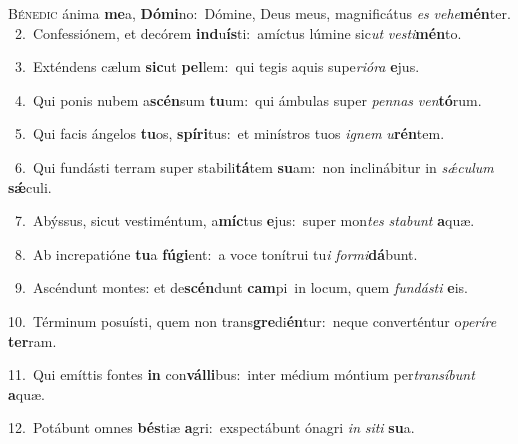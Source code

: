 \lettrine{\initial\textcolor{\initialcolor}{B}}{énedic} ánima \textbf{me}\-a, \textbf{Dó}\-\textbf{mi}no:~\star Dómine, Deus meus, magnificátus \textit{es} \textit{ve}\-\textit{he}\textbf{mén}ter.\\
{\numbfont\textcolor{\numbcolor}{~2.}}~Confessiónem, et decórem \textbf{ind}\-u\-\textbf{ís}\-ti:~\star amíctus lúmine sic\textit{ut} \textit{ves}\-\textit{ti}\textbf{mén}to.\par
{\numbfont\textcolor{\numbcolor}{~3.}}~Exténdens cælum \textbf{sic}\-ut \textbf{pel}\-lem:~\star qui tegis aquis supe\-\textit{ri}\-\textit{ó}\textit{ra} \textbf{e}\-jus.\par
{\numbfont\textcolor{\numbcolor}{~4.}}~Qui ponis nubem a\-\textbf{scén}\-sum \textbf{tu}\-um:~\star qui ámbulas super \textit{pen}\-\textit{nas} \textit{ven}\-\textbf{tó}rum.\par
{\numbfont\textcolor{\numbcolor}{~5.}}~Qui facis ángelos \textbf{tu}\-os, \textbf{spí}\-\textbf{ri}tus:~\star et minístros tuos \textit{i}\-\textit{gnem} \textit{u}\-\textbf{rén}tem.\par
{\numbfont\textcolor{\numbcolor}{~6.}}~Qui fundásti terram super stabili\-\textbf{tá}\-tem \textbf{su}\-am:~\star non inclinábitur in \textit{sǽ}\-\textit{cu}\textit{lum} \textbf{sǽ}\-culi.\par
{\numbfont\textcolor{\numbcolor}{~7.}}~Abýssus, sicut vestiméntum, a\-\textbf{míc}\-tus \textbf{e}\-jus:~\star super mon\textit{tes} \textit{sta}\-\textit{bunt} \textbf{a}\-quæ.\par
{\numbfont\textcolor{\numbcolor}{~8.}}~Ab increpatióne \textbf{tu}\-a \textbf{fú}\-\textbf{gi}ent:~\star a voce tonítrui tu\textit{i} \textit{for}\-\textit{mi}\textbf{dá}bunt.\par
{\numbfont\textcolor{\numbcolor}{~9.}}~Ascéndunt montes: et de\-\textbf{scén}\-dunt \textbf{cam}\-pi~\star in locum, quem \textit{fun}\-\textit{dás}\textit{ti} \textbf{e}\-is.\par
{\numbfont\textcolor{\numbcolor}{10.}}~Términum posuísti, quem non trans\-\textbf{gre}\-di\-\textbf{én}\-tur:~\star neque converténtur o\-\textit{pe}\-\textit{rí}\textit{re} \textbf{ter}\-ram.\par
{\numbfont\textcolor{\numbcolor}{11.}}~Qui emíttis fontes \textbf{in} con\-\textbf{vál}\-\textbf{li}bus:~\star inter médium móntium per\-\textit{trans}\-\textit{í}\textit{bunt} \textbf{a}\-quæ.\par
{\numbfont\textcolor{\numbcolor}{12.}}~Potábunt omnes \textbf{bés}\-tiæ \textbf{a}\-gri:~\star exspectábunt ónagri \textit{in} \textit{si}\-\textit{ti} \textbf{su}\-a.\par

